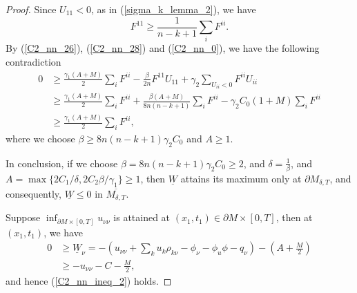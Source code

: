 \documentclass[12pt]{amsart}
\theoremstyle{definition}
\theoremstyle{remark}
\numberwithin{equation}{section}
\begin{document}
\begin{proof}
	
	Since $U_{11} < 0$, as in (\ref{sigma_k_lemma_2}), we have
	\begin{equation}
	F^{11} \geq \frac{1}{n-k+1} \sum_i F^{ii}.
	\end{equation} 
	By (\ref{C2_nn_26}), (\ref{C2_nn_28}) and (\ref{C2_nn_0}), we have the following contradiction
	\begin{equation}\label{C2_nn_31}
	\begin{aligned}
	0 &\geq \frac{\gamma_1 (A + M)}{2} \sum_i F^{ii} - \frac{\beta}{2n} F^{11} U_{11} + \gamma_2 \sum_{U_{ii} < 0} F^{ii} U_{ii}\\
	&\geq \frac{\gamma_1 (A + M)}{2} \sum_i F^{ii} + \frac{\beta(A + M)}{8n(n-k+1)} \sum_i F^{ii} - \gamma_2 C_0 (1 + M) \sum_{i} F^{ii}\\
	& \geq \frac{\gamma_1 (A + M)}{2} \sum_i F^{ii},
	\end{aligned}
	\end{equation}
	where we choose $\beta \geq 8n(n-k+1)\gamma_2 C_0$ and $A \geq 1$.
	
	
	In conclusion, if we choose $\beta = 8 n (n-k+1) \gamma_2 C_0 \geq 2$, and $\delta = \frac{1}{\beta}$, and $A = \max\{2C_1/\delta, 2C_2 \beta / \gamma_1 \} \geq 1$, then $\underline{W}$ attains its maximum only at $\partial M_{\delta, T}$, and consequently, $\underline{W} \leq 0$ in $\overline{M_{\delta, T}}$.
	
	Suppose $\inf_{\partial M \times [0, T]} u_{\nu\nu}$ is attained at $(x_1, t_1) \in \partial M \times [0, T]$, then at $(x_1, t_1)$, we have
	\begin{equation}%
	\begin{aligned}
	0 &\geq \underline{W}_\nu 
	= - \left(u_{\nu\nu} + \sum_k u_{k} \rho_{k\nu} - \phi_\nu - \phi_{u} \phi - q_{\nu} \right) - (A + \frac{M}{2}) \\
	&\geq - u_{\nu\nu} - C - \frac{M}{2},
	\end{aligned}
	\end{equation}
	and hence (\ref{C2_nn_ineq_2}) holds. 
\end{proof}
\end{document}
